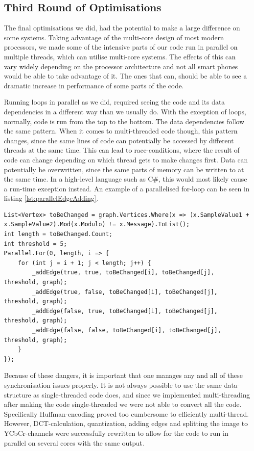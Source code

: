 \subsection{Third Round of Optimisations}
The final optimisations we did, had the potential to make a large difference on some systems.
Taking advantage of the multi-core design of most modern processors, we made some of the intensive parts of our code run in parallel on multiple threads, which can utilise multi-core systems.
The effects of this can vary widely depending on the processor architecture and not all smart phones would be able to take advantage of it.
The ones that can, should be able to see a dramatic increase in performance of some parts of the code.

Running loops in parallel as we did, required seeing the code and its data dependencies in a different way than we usually do.
With the exception of loops, normally, code is run from the top to the bottom.
The data dependencies follow the same pattern.
When it comes to multi-threaded code though, this pattern changes, since the same lines of code can potentially be accessed by different threads at the same time.
This can lead to race-conditions, where the result of code can change depending on which thread gets to make changes first.
Data can potentially be overwritten, since the same parts of memory can be written to at the same time.
In a high-level language such as C\#, this would most likely cause a run-time exception instead.
An example of a parallelised for-loop can be seen in listing \ref{lst:parallelEdgeAdding}.

\begin{lstlisting}[firstnumber=677,label=lst:parallelEdgeAdding, caption={Parallelisation of the algorithm for adding edges to the graph. From third round JPEGImage.cs.}]
List<Vertex> toBeChanged = graph.Vertices.Where(x => (x.SampleValue1 + x.SampleValue2).Mod(x.Modulo) != x.Message).ToList();
int length = toBeChanged.Count;
int threshold = 5;
Parallel.For(0, length, i => {
    for (int j = i + 1; j < length; j++) {
        _addEdge(true, true, toBeChanged[i], toBeChanged[j], threshold, graph);
        _addEdge(true, false, toBeChanged[i], toBeChanged[j], threshold, graph);
        _addEdge(false, true, toBeChanged[i], toBeChanged[j], threshold, graph);
        _addEdge(false, false, toBeChanged[i], toBeChanged[j], threshold, graph);
    }
});
\end{lstlisting}

Because of these dangers, it is important that one manages any and all of these synchronisation issues properly.
It is not always possible to use the same data-structure as single-threaded code does, and since we implemented multi-threading after making the code single-threaded we were not able to convert all the code.
Specifically Huffman-encoding proved too cumbersome to efficiently multi-thread.
However, DCT-calculation, quantization, adding edges and splitting the image to YCbCr-channels were successfully rewritten to allow for the code to run in parallel on several cores with the same output.

